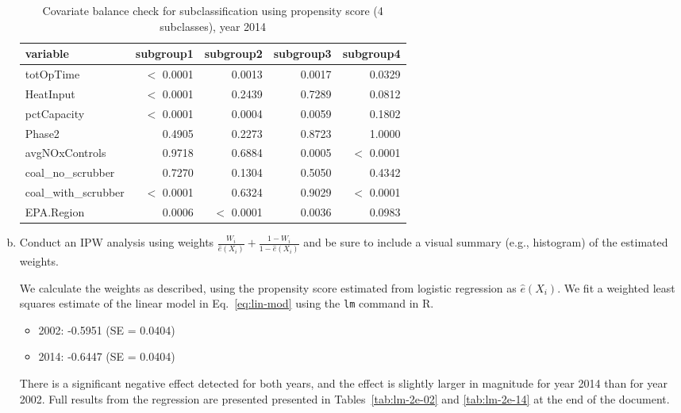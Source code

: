 \begin{enumerate}[(a)]
  \begin{table}[ht]
    \centering
    \begin{tabular}{lrrrr}
      \toprule
      variable & subgroup1 & subgroup2 & subgroup3 & subgroup4 \\ 
      \midrule
      totOpTime & $<$ 0.0001 & 0.0013 & 0.0017 & 0.0329 \\ 
      HeatInput & $<$ 0.0001 & 0.2439 & 0.7289 & 0.0812 \\ 
      pctCapacity & $<$ 0.0001 & 0.0004 & 0.0059 & 0.1802 \\ 
      Phase2 & 0.4905 & 0.2273 & 0.8723 & 1.0000 \\ 
      avgNOxControls & 0.9718 & 0.6884 & 0.0005 & $<$ 0.0001 \\ 
      coal\_no\_scrubber & 0.7270 & 0.1304 & 0.5050 & 0.4342 \\ 
      coal\_with\_scrubber & $<$ 0.0001 & 0.6324 & 0.9029 & $<$ 0.0001 \\ 
      EPA.Region & 0.0006 & $<$ 0.0001 & 0.0036 & 0.0983 \\ 
      \bottomrule
    \end{tabular}
    \caption{Covariate balance check for subclassification using propensity score (4 subclasses), year 2014} 
    \label{tab-bal2d-14}
  \end{table}

\item
  \begin{quoting}
    Conduct an IPW analysis using weights
    $\frac{W_i}{\hat e(X_i)} + \frac{1 - W_i}{1 - \hat e(X_i)}$ and be
    sure to include a visual summary (e.g., histogram) of the
    estimated weights.
  \end{quoting}

  We calculate the weights as described, using the propensity score
  estimated from logistic regression as $\hat e(X_i)$.  We fit a
  weighted least squares estimate of the linear model in
  Eq.~\eqref{eq:lin-mod} using the \texttt{lm} command in R.
  \begin{itemize}
  \item 2002: -0.5951 (SE = 0.0404)
  \item 2014: -0.6447 (SE = 0.0404)
  \end{itemize}
  There is a significant negative effect detected for both years, and
  the effect is slightly larger in magnitude for year 2014 than for
  year 2002.  Full results from the regression are presented presented
  in Tables~\ref{tab:lm-2e-02} and \ref{tab:lm-2e-14} at the end of
  the document.
  

\end{enumerate}
